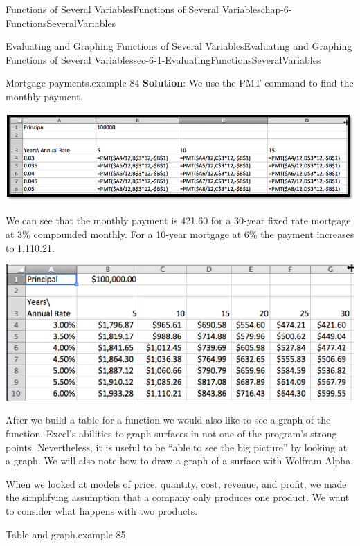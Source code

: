 \documentclass[oneside,10pt,]{book}
\newcommand{\terminology}[1]{\textbf{#1}}
\numberwithin{equation}{section}
\begin{document}
\begin{chapterptx}{Functions of Several Variables}{}{Functions of Several Variables}{}{}{chap-6-FunctionsSeveralVariables}
\begin{sectionptx}{Evaluating and Graphing Functions of Several Variables}{}{Evaluating and Graphing Functions of Several Variables}{}{}{sec-6-1-EvaluatingFunctionsSeveralVariables}
\begin{example}{Mortgage payments.}{example-84}
\hypertarget{p-2130}{}%
\terminology{Solution}: We use the PMT command to find the monthly payment.%
\begin{sidebyside}{1}{0.1}{0.1}{0}%
\begin{sbspanel}{0.8}%
\includegraphics[width=1\linewidth]{images/sec-6-1-7.png}
\end{sbspanel}%
\end{sidebyside}%
\par
\hypertarget{p-2131}{}%
We can see that the monthly payment is \textdollar{}421.60 for a 30-year fixed rate mortgage at 3\% compounded monthly.  For a 10-year mortgage at 6\% the payment increases to \textdollar{}1,110.21.%
\begin{sidebyside}{1}{0.15}{0.15}{0}%
\begin{sbspanel}{0.7}%
\includegraphics[width=1\linewidth]{images/sec-6-1-8.png}
\end{sbspanel}%
\end{sidebyside}%
\end{example}
\hypertarget{p-2132}{}%
After we build a table for a function we would also like to see a graph of the function.  Excel’s abilities to graph surfaces in not one of the program’s strong points.  Nevertheless, it is useful to be “able to see the big picture” by looking at a graph.  We will also note how to draw a graph of a surface with Wolfram Alpha.%
\par
\hypertarget{p-2133}{}%
When we looked at models of price, quantity, cost, revenue, and profit, we made the simplifying assumption that a company only produces one product.  We want to consider what happens with two products.%
\begin{example}{Table and graph.}{example-85}%

\end{example}
\end{sectionptx}
\end{chapterptx}
\end{document}
